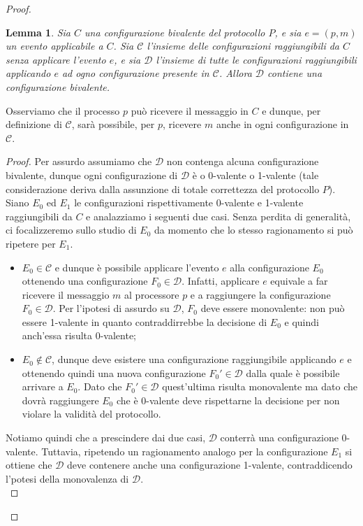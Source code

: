 \documentclass{article}
\newtheorem{lemma}{Lemma}
\begin{document}
\begin{proof}
 \begin{lemma}
Sia $C$ una configurazione bivalente del protocollo $P$, e sia $e=(p,m)$ un evento applicabile a $C$. Sia $\mathcal{C}$ l'insieme delle configurazioni raggiungibili da $C$ senza applicare l'evento $e$, e sia $\mathcal{D}$ l'insieme di tutte le configurazioni raggiungibili applicando $e$ ad ogno configurazione presente in $\mathcal{C}$. Allora $\mathcal{D}$ contiene una configurazione bivalente. 
\end{lemma}
Osserviamo che il processo $p$ può ricevere il messaggio in $C$ e dunque, per definizione di $\mathcal{C}$, sarà possibile, per $p$, ricevere $m$ anche in ogni configurazione in $\mathcal{C}$.
\begin{proof}
Per assurdo assumiamo che $\mathcal{D}$ non contenga alcuna configurazione bivalente, dunque ogni configurazione di $\mathcal{D}$ è o 0-valente o 1-valente (tale considerazione deriva dalla assunzione di totale correttezza del protocollo $P$). Siano $E_0$ ed $E_1$ le configurazioni rispettivamente 0-valente e 1-valente raggiungibili da $C$ e analazziamo i seguenti due casi. Senza perdita di generalità, ci focalizzeremo sullo studio di $E_0$ da momento che lo stesso ragionamento si può ripetere per $E_1$.
\begin{itemize}
\item $E_0 \in \mathcal{C}$ e dunque è possibile applicare l'evento $e$ alla configurazione $E_0$ ottenendo una configurazione $F_0 \in \mathcal{D}$. Infatti, applicare $e$ equivale a far ricevere il messaggio $m$ al processore $p$ e a raggiungere la configurazione $F_0 \in \mathcal{D}$. Per l'ipotesi di assurdo su $\mathcal{D}$, $F_0$ deve essere monovalente: non può essere 1-valente in quanto contraddirrebbe la decisione di $E_0$ e quindi anch'essa risulta 0-valente;
\item  $E_0 \not \in \mathcal{C}$, dunque deve esistere una configurazione raggiungibile applicando $e$ e ottenendo quindi una nuova configurazione $F_0' \in \mathcal{D}$ dalla quale è possibile arrivare a $E_0$. Dato che $F_0' \in \mathcal{D}$ quest'ultima risulta monovalente ma dato che dovrà raggiungere $E_0$ che è 0-valente deve rispettarne la decisione per non violare la validità del protocollo.    
\end{itemize}
Notiamo quindi che a prescindere dai due casi, $\mathcal{D}$ conterrà una configurazione 0-valente. Tuttavia, ripetendo un ragionamento analogo per la configurazione $E_1$ si ottiene che $\mathcal{D}$ deve contenere anche una configurazione 1-valente, contraddicendo l'potesi della monovalenza di $\mathcal{D}$. \\

\end{proof}
\end{proof}
\end{document}
